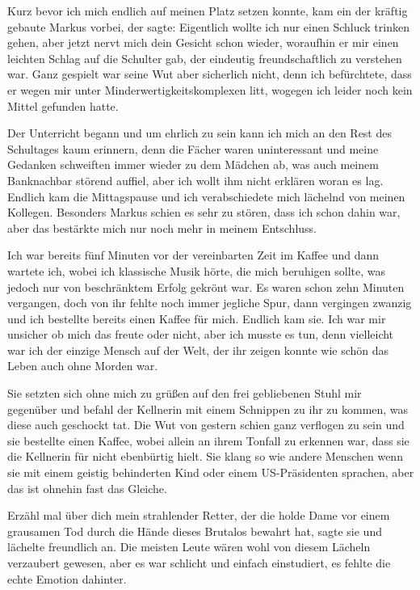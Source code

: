 \documentclass[11pt, a5paper]{article}
\newcommand{\rs}{Markus } %
\begin{document}
\begin{spacing}{1.2}
		Kurz bevor ich mich endlich auf meinen Platz setzen konnte, kam ein der kräftig gebaute \rs vorbei, der sagte: \frqq Eigentlich wollte ich nur einen Schluck trinken gehen, aber jetzt nervt mich dein Gesicht schon wieder\flqq , woraufhin er mir einen leichten Schlag auf die Schulter gab, der eindeutig freundschaftlich zu verstehen war. Ganz gespielt war seine Wut aber sicherlich nicht, denn ich befürchtete, dass er wegen mir unter Minderwertigkeitskomplexen litt, wogegen ich leider noch kein Mittel gefunden hatte.
		
		Der Unterricht begann und um ehrlich zu sein kann ich mich an den Rest des Schultages kaum erinnern, denn die Fächer waren uninteressant und meine Gedanken schweiften immer wieder zu dem Mädchen ab, was auch meinem Banknachbar störend auffiel, aber ich wollt ihm nicht erklären woran es lag.\\
		
		Endlich kam die Mittagspause und ich verabschiedete mich lächelnd von meinen Kollegen. Besonders \rs schien es sehr zu stören, dass ich schon dahin war, aber das bestärkte mich nur noch mehr in meinem Entschluss.
		
		Ich war bereits fünf Minuten vor der vereinbarten Zeit im Kaffee und dann wartete ich, wobei ich klassische Musik hörte, die mich beruhigen sollte, was jedoch nur von beschränktem Erfolg gekrönt war. Es waren schon zehn Minuten vergangen, doch von ihr fehlte noch immer jegliche Spur, dann vergingen zwanzig und ich bestellte bereits einen Kaffee für mich. Endlich kam sie. Ich war mir unsicher ob mich das freute oder nicht, aber ich musste es tun, denn vielleicht war ich der einzige Mensch auf der Welt, der ihr zeigen konnte wie schön das Leben auch ohne Morden war.
		
		Sie setzten sich ohne mich zu grüßen auf den frei gebliebenen Stuhl mir gegenüber und befahl der Kellnerin mit einem Schnippen zu ihr zu kommen, was diese auch geschockt tat. Die Wut von gestern schien ganz verflogen zu sein und sie bestellte einen Kaffee, wobei allein an ihrem Tonfall zu erkennen war, dass sie die Kellnerin für nicht ebenbürtig hielt. Sie klang so wie andere Menschen wenn sie mit einem geistig behinderten Kind oder einem US-Präsidenten sprachen, aber das ist ohnehin fast das Gleiche.
		
		\frqq Erzähl mal über dich mein strahlender Retter, der die holde Dame vor einem grausamen Tod durch die Hände dieses Brutalos bewahrt hat\flqq , sagte sie und lächelte freundlich an. Die meisten Leute wären wohl von diesem Lächeln verzaubert gewesen, aber es war schlicht und einfach einstudiert, es fehlte die echte Emotion dahinter.
		

\end{spacing}
\end{document}
